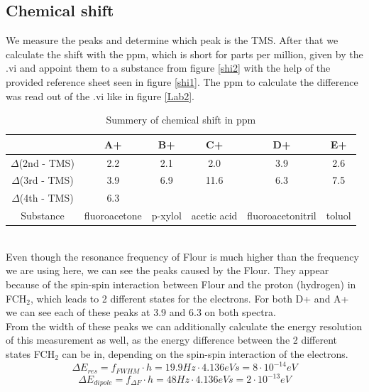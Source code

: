 \subsection{Chemical shift}\label{chemical-shift}

We measure the peaks and determine which peak is the TMS. After that we calculate the shift with the ppm, which is short for parts per million, given by the .vi and appoint them to a substance from figure \ref{shi2} with the help of the provided reference sheet seen in figure \ref{shi1}. The ppm to calculate the difference was read out of the .vi like in figure \ref{Lab2}. \\
\begin{table}[h!]
\centering
\begin{tabular}{c||c|c|c|c|c}
 & A+ & B+ & C+ & D+ & E+ \\
\hline
\hline
$\Delta$(2nd - TMS) & 2.2 & 2.1 & 2.0 & 3.9 & 2.6 \\
\hline
$\Delta$(3rd - TMS) & 3.9 & 6.9 & 11.6 & 6.3 & 7.5 \\
\hline
$\Delta$(4th - TMS) & 6.3 &  &  &  & \\
\hline
\hline
Substance & fluoroacetone & p-xylol & acetic acid & fluoroacetonitril & toluol \\
\end{tabular}
\caption{Summery of chemical shift in ppm}
\label{table2}
\end{table}\\
Even though the resonance frequency of Flour is much higher than the frequency we are using here, we can see the peaks caused by the Flour. They appear because of the spin-spin interaction between Flour and the proton (hydrogen) in FCH$_2$, which leads to 2 different states for the electrons. For both D+ and A+ we can see each of these peaks at 3.9 and 6.3 on both spectra.
\vspace{2mm}\\
From the width of these peaks we can additionally calculate the energy resolution of this measurement as well, as the energy difference between the 2 different states FCH$_2$ can be in, depending on the spin-spin interaction of the electrons.
\begin{equation}\label{E_r}
	\Delta E_{res} = f_{FWHM} \cdot h = 19.9 Hz \cdot 4.136eVs = 8 \cdot 10^{-14}eV
\end{equation}
\begin{equation}\label{E_d}
	\Delta E_{dipole} = f_{\Delta F} \cdot h = 48 Hz \cdot 4.136eVs = 2 \cdot 10^{-13}eV
\end{equation}\\
